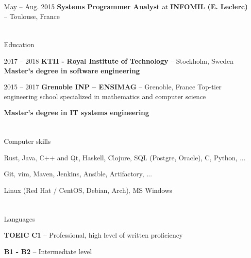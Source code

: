 \documentclass[a4paper, 10pt]{article}
\begin{document}
\begin{datedEntry}
    {May -- Aug. 2015}
    {\textbf{Systems Programmer Analyst} at \textbf{INFOMIL (E. Leclerc)} -- Toulouse, France}
\end{datedEntry}


\section{\faGraduationCap}{Education}

\begin{datedEntry}
    {2017 -- 2018}
    {\textbf{KTH - Royal Institute of Technology} -- Stockholm, Sweden}
    \textbf{Master's degree in software engineering}

    \smallskip
\end{datedEntry}

\begin{datedEntry}
    {2015 -- 2017}
    {\textbf{Grenoble INP -- ENSIMAG} -- Grenoble, France}
    Top-tier engineering school specialized in mathematics and computer science

    \smallskip
    \textbf{Master's degree in IT systems engineering}
\end{datedEntry}


\section{\faLaptop}{Computer skills}

{Rust, Java, C++ and Qt, Haskell, Clojure, SQL (Postgre, Oracle), C, Python, ...}

{Git, vim, Maven, Jenkins, Ansible, Artifactory, ...}

{Linux (Red Hat / CentOS, Debian, Arch), MS Windows}


\section{\faComment[regular]}{Languages}


{\textbf{TOEIC C1} -- Professional, high level of written proficiency}

{\textbf{B1 - B2} -- Intermediate level}
\end{document}

